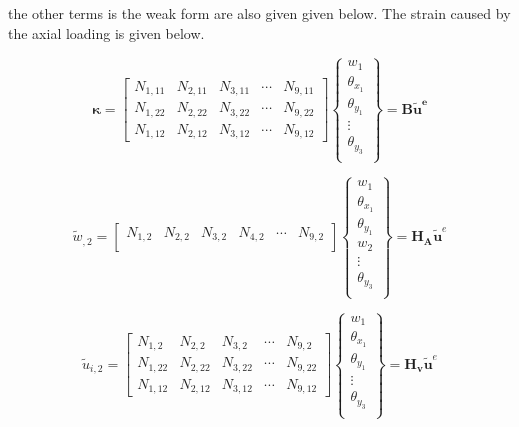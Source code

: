 \documentclass[main.tex]{subfiles}
\begin{document}
the other terms is the weak form are also given given below. The strain caused by the axial loading is given below.



\begin{equation}\label{eq:kappa_KR}
\mathbf{ \kappa } = 
\begin{bmatrix}
N_{1,11} & N_{2,11} & N_{3,11} & \cdots & N_{9,11} \\
N_{1,22} & N_{2,22} & N_{3,22} & \cdots & N_{9,22} \\
N_{1,12} & N_{2,12} & N_{3,12} & \cdots & N_{9,12} 
\end{bmatrix} 
\left\{
\begin{array}{r}
w_1 \\
\theta_{x_1} \\
\theta_{y_1} \\
\vdots \\
\theta_{y_{3}} \\
\end{array} \right\}=\mathbf{ B } \mathbf{\tilde{u}^e}
\end{equation}

\begin{equation}\label{eq:axial_KR}
\tilde{w}_{,2} = 
\begin{bmatrix}
N_{1,2}  & N_{2,2}  & N_{3,2} & N_{4,2}  & \cdots & N_{9,2} \\
\end{bmatrix} 
\left\{
\begin{array}{r}
w_1 \\
\theta_{x_1} \\
\theta_{y_1} \\
w_{2} \\
\vdots \\
\theta_{y_{3}} \\
\end{array} \right\}=\mathbf{ H_A }\tilde{\mathbf{u}}^e
\end{equation}

\begin{equation}
\tilde{u}_{i,2} = 
\begin{bmatrix}
N_{1,2}  & N_{2,2}  & N_{3,2}  & \cdots & N_{9,2} \\
N_{1,22} & N_{2,22} & N_{3,22} & \cdots & N_{9,22} \\
N_{1,12} & N_{2,12} & N_{3,12} & \cdots & N_{9,12} 
\end{bmatrix}
\left\{
\begin{array}{r}
w_1 \\
\theta_{x_1} \\
\theta_{y_1} \\
\vdots \\
\theta_{y_{3}} \\
\end{array} \right\}=\mathbf{ H_v }\tilde{\mathbf{u}}^e
\end{equation}
\end{document}

